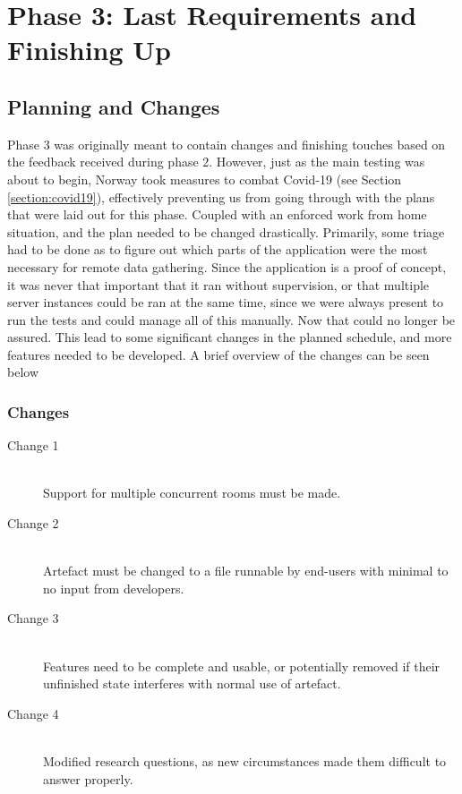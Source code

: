 
\chapter{Phase 3: Last Requirements and Finishing Up} \label{chap:7}
\label{chap:phase3}

\section{Planning and Changes}
Phase 3 was originally meant to contain changes and finishing touches based on the feedback received during phase 2. However, just as the main testing was about to begin, Norway took measures to combat Covid-19 (see Section \ref{section:covid19}), effectively preventing us from going through with the plans that were laid out for this phase. Coupled with an enforced work from home situation, and the plan needed to be changed drastically. Primarily, some triage had to be done as to figure out which parts of the application were the most necessary for remote data gathering. Since the application is a proof of concept, it was never that important that it ran without supervision, or that multiple server instances could be ran at the same time, since we were always present to run the tests and could manage all of this manually. Now that could no longer be assured. This lead to some significant changes in the planned schedule, and more features needed to be developed. A brief overview of the changes can be seen below

\subsection{Changes}
\begin{description}
    \item [Change 1]\hfill \\
    Support for multiple concurrent rooms must be made. 
    \item [Change 2]\hfill \\
    Artefact must be changed to a file runnable by end-users with minimal to no input from developers.
    \item [Change 3]\hfill \\
    Features need to be complete and usable, or potentially removed if their unfinished state interferes with normal use of artefact.
    \item[Change 4]\hfill \\
    Modified research questions, as new circumstances made them difficult to answer properly.
\end{description}


